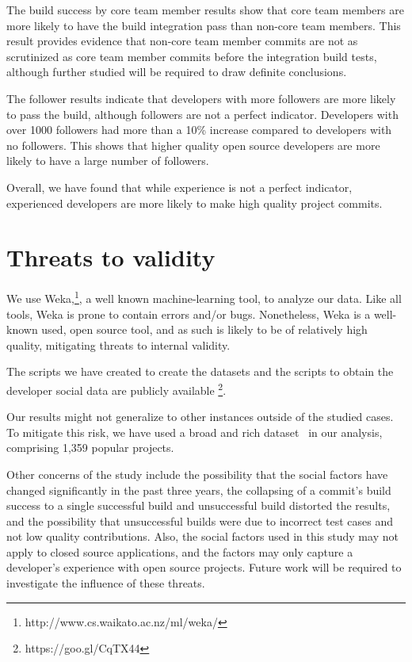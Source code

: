 \documentclass[10pt, conference]{IEEEtran}
\begin{document}
The build success by core team member results show that core team members are
more likely to have the build integration pass than non-core team members.  This
result provides evidence that non-core team member commits are not as
scrutinized as core team member commits before the integration build tests, although further studied will be required to draw definite
conclusions.

The follower results indicate that developers with more followers are more
likely to pass the build, although followers are not a perfect indicator.
Developers with over 1000 followers had more than a 10\% increase compared to
developers with no followers.  This shows that higher quality open source developers are more
likely to have a large number of followers.

Overall, we have found that while experience is not a perfect indicator, 
experienced developers are more likely to make high quality project commits.

\section{Threats to validity}

We use Weka,\footnote{http://www.cs.waikato.ac.nz/ml/weka/}, a well known machine-learning tool,
to analyze our data.
Like all tools, Weka is prone to contain errors and/or bugs. 
Nonetheless, Weka is a well-known used, open source tool, and as such is likely
to be of relatively high quality, mitigating threats to internal validity. 

 The scripts we have created to create the datasets and the 
 scripts to obtain the developer social data are publicly available 
 \footnote{https://goo.gl/CqTX44}.

Our results might not generalize to 
 other instances outside of the studied cases.  To mitigate this risk, we have used a broad and rich 
 dataset~\cite{msr17challenge} in our analysis, comprising 1,359 popular projects.

 Other concerns of the study include the possibility that the social factors
 have changed significantly in the past three years, the collapsing of a
 commit's build success to a single successful build and unsuccessful build
 distorted the results, and the possibility that unsuccessful builds were due to
 incorrect test cases and not low quality contributions. Also, the social factors used
 in this study may not apply to closed source applications, and the factors may
 only capture a developer's experience with open source projects. Future work 
 will be required to investigate the influence of these threats.
 
\end{document}
